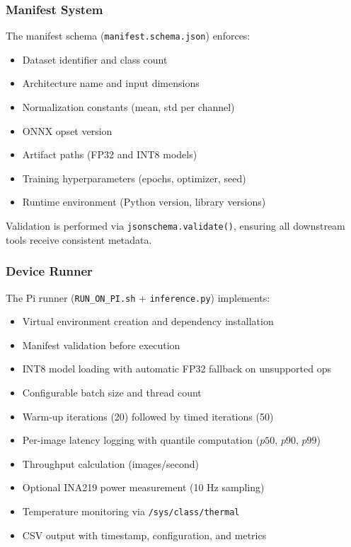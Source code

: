 \documentclass[review]{elsarticle}
\begin{document}
\subsubsection{Manifest System}

The manifest schema (\texttt{manifest.schema.json}) enforces:

\begin{itemize}
\item Dataset identifier and class count
\item Architecture name and input dimensions
\item Normalization constants (mean, std per channel)
\item ONNX opset version
\item Artifact paths (FP32 and INT8 models)
\item Training hyperparameters (epochs, optimizer, seed)
\item Runtime environment (Python version, library versions)
\end{itemize}

Validation is performed via \texttt{jsonschema.validate()}, ensuring all downstream tools receive consistent metadata.

\subsubsection{Device Runner}

The Pi runner (\texttt{RUN\_ON\_PI.sh} + \texttt{inference.py}) implements:

\begin{itemize}
\item Virtual environment creation and dependency installation
\item Manifest validation before execution
\item INT8 model loading with automatic FP32 fallback on unsupported ops
\item Configurable batch size and thread count
\item Warm-up iterations (20) followed by timed iterations (50)
\item Per-image latency logging with quantile computation ($p50$, $p90$, $p99$)
\item Throughput calculation (images/second)
\item Optional INA219 power measurement (10 Hz sampling)
\item Temperature monitoring via \texttt{/sys/class/thermal}
\item CSV output with timestamp, configuration, and metrics
\end{itemize}
\end{document}
